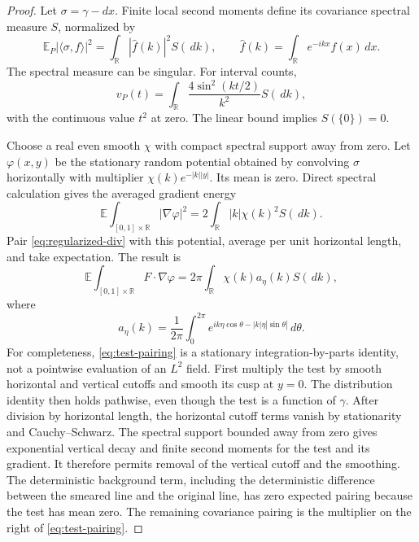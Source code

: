 \documentclass[11pt,reqno]{amsart}
\numberwithin{equation}{section}
\theoremstyle{definition}
\theoremstyle{remark}
\newcommand{\R}{\mathbb R}
\newcommand{\E}{\mathbb E}
\newcommand{\1}{\mathbf 1}
\newcommand{\dd}{\,d}
\begin{document}
\begin{proof}
Let $\sigma=\gamma-dx$. Finite local second moments define its
covariance spectral measure $S$, normalized by
\[
\E_P|\langle\sigma,f\rangle|^2
=\int_\R|\widehat f(k)|^2S(\dd k),\qquad
\widehat f(k)=\int_\R e^{-ikx}f(x)\dd x.
\]
The spectral measure can be singular. For interval counts,
\begin{equation}\label{eq:count-spectrum}
v_P(t)=\int_\R\frac{4\sin^2(kt/2)}{k^2}S(\dd k),
\end{equation}
with the continuous value $t^2$ at zero.
The linear bound implies $S(\{0\})=0$.

Choose a real even smooth $\chi$ with compact spectral support away
from zero. Let $\varphi(x,y)$ be the stationary random potential
obtained by convolving $\sigma$ horizontally with multiplier
$\chi(k)e^{-|k||y|}$. Its mean is zero. Direct spectral calculation
gives the averaged gradient energy
\begin{equation}\label{eq:test-energy}
\E\int_{[0,1]\times\R}|\nabla\varphi|^2
=2\int_\R |k|\chi(k)^2S(\dd k).
\end{equation}
Pair \eqref{eq:regularized-div} with this potential, average per unit
horizontal length, and take expectation. The result is
\begin{equation}\label{eq:test-pairing}
\E\int_{[0,1]\times\R}F\cdot\nabla\varphi
=2\pi\int_\R\chi(k)a_\eta(k)S(\dd k),
\end{equation}
where
\[
a_\eta(k)=\frac1{2\pi}\int_0^{2\pi}
e^{ik\eta\cos\theta-|k|\eta|\sin\theta|}\dd\theta.
\]
For completeness, \eqref{eq:test-pairing} is a stationary
integration-by-parts identity, not a pointwise evaluation of an
$L^2$ field. First multiply the test by smooth horizontal and vertical
cutoffs and smooth its cusp at $y=0$. The distribution identity then
holds pathwise, even though the test is a function of $\gamma$.
After division by horizontal length, the horizontal cutoff terms
vanish by stationarity and Cauchy--Schwarz. The spectral support
bounded away from zero gives exponential vertical decay and finite
second moments for the test and its gradient. It therefore permits
removal of the vertical cutoff and the smoothing. The deterministic
background term, including the deterministic difference between the
smeared line and the original line, has zero expected pairing because
the test has mean zero. The remaining covariance pairing is the
multiplier on the right of \eqref{eq:test-pairing}.


\end{proof}
\end{document}
